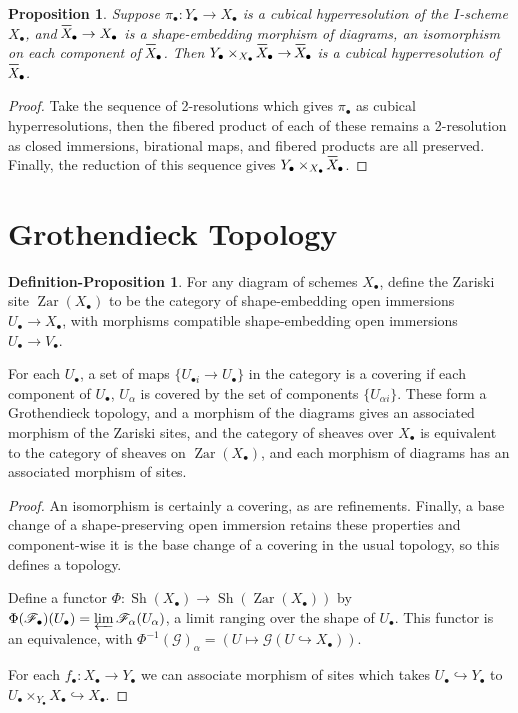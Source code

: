 \documentclass[proquest]{uwthesis}[2014/11/13]
\newtheorem{prop}[theorem]{Proposition}
\theoremstyle{definition}
\newtheorem{defprop}[theorem]{Definition-Proposition}
\DeclareMathOperator{\Sh}{Sh}
\DeclareMathOperator{\Zar}{Zar}
\newcommand{\FF}{\mathscr{F}}
\newcommand{\GG}{\mathscr{G}}
\newcommand*\xbar[1]{%
  \hbox{%
    \vbox{%
      \hrule height 0.5pt %
      \kern0.5ex%
      \hbox{%
        \kern-0.1em%
        \ensuremath{#1}%
        \kern-0.1em%
      }%
    }%
  }%
}
\begin{document}
\begin{prop}
	Suppose $\pi_\bullet : Y_\bullet \rightarrow X_\bullet$ is a cubical hyperresolution of the $I$-scheme $X_\bullet$, and $\xbar{X}_\bullet \rightarrow X_\bullet$ is a shape-embedding morphism of diagrams, an isomorphism on each component of $\xbar{X}_\bullet$.
	Then $Y_\bullet \times_{X_\bullet} \xbar{X}_\bullet \rightarrow \xbar{X}_\bullet$ is a cubical hyperresolution of $\xbar{X}_\bullet$.
\end{prop}
\begin{proof}
	Take the sequence of 2-resolutions which gives $\pi_\bullet$ as cubical hyperresolutions, then the fibered product of each of these remains a 2-resolution as closed immersions, birational maps, and fibered products are all preserved.
	Finally, the reduction of this sequence gives $Y_\bullet \times_{X_\bullet} \xbar{X}_\bullet$.
\end{proof}
	
\section{Grothendieck Topology}
\begin{defprop}
	For any diagram of schemes $X_\bullet$, define the Zariski site $\Zar(X_\bullet)$ to be the category of shape-embedding open immersions $U_\bullet \rightarrow X_\bullet$, with morphisms compatible shape-embedding open immersions $U_\bullet \rightarrow V_\bullet$.
	
	For each $U_\bullet$, a set of maps $\{U_{\bullet i} \rightarrow U_\bullet\}$ in the category is a covering if each component of $U_\bullet$, $U_\alpha$ is covered by the set of components $\{U_{\alpha i}\}$.
	These form a Grothendieck topology, and a morphism of the diagrams gives an associated morphism of the Zariski sites, and the category of sheaves over $X_\bullet$ is equivalent to the category of sheaves on $\Zar(X_\bullet)$, and each morphism of diagrams has an associated morphism of sites.
\end{defprop}
\begin{proof}
	An isomorphism is certainly a covering, as are refinements.
	Finally, a base change of a shape-preserving open immersion retains these properties and component-wise it is the base change of a covering in the usual topology, so this defines a topology.
	
	Define a functor $\Phi : \Sh(X_\bullet) \rightarrow \Sh(\Zar(X_\bullet))$ by $\Phi(\FF_\bullet)(U_\bullet) = \varprojlim  \FF_{\alpha}(U_\alpha)$, a limit ranging over the shape of $U_\bullet$.
	This functor is an equivalence, with $\Phi^{-1}(\GG)_\alpha = (U \mapsto \GG(U \hookrightarrow X_\bullet))$.
	
	For each $f_\bullet : X_\bullet \rightarrow Y_\bullet$ we can associate morphism of sites which takes $U_\bullet \hookrightarrow Y_\bullet$ to $U_\bullet \times_{Y_\bullet} X_\bullet \hookrightarrow X_\bullet$.
\end{proof}
\end{document}
